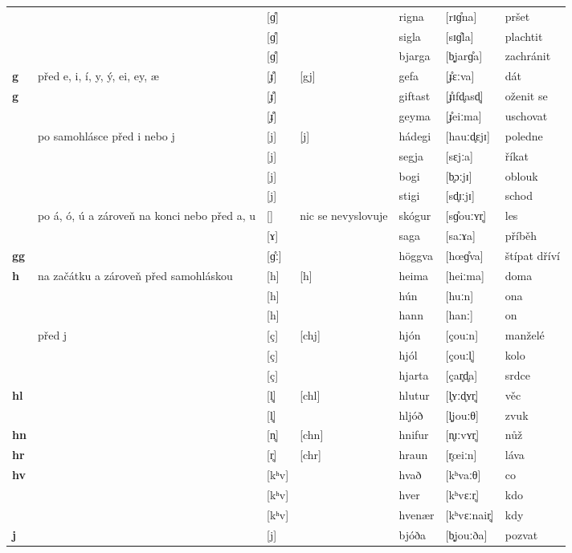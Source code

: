 \begin{longtable}{>{\bfseries}lX>{\IPAFont}lXl>{\IPAFont}ll}
 &  & {[ɡ̊]} &  & rigna & {[rɪɡ̊na]} & pršet \\ 
 &  & {[ɡ̊]} &   & sigla & {[sɪɡ̊la]} & plachtit \\ 
 &  & {[ɡ̊]} &   & bjarga & {[b̥jarɡ̊a]} & zachránit \\ 
g  & před e, i, í, y, ý, ei, ey, æ & {[\r ɟ]} & [gj] & gefa & {[\r ɟɛːva]} & dát \\ 
g &  & {[\r ɟ]} &   & giftast & {[\r ɟɪfd̥asd̥]} & oženit se \\ 
 &  & {[\r ɟ]} &   & geyma & {[\r ɟeiːma]} & uschovat \\ 
 & po samohlásce před i nebo j & {[j]} & [j] & hádegi & {[hauːd̥ɛjɪ]} & poledne \\ 
 &  & {[j]} &   & segja & {[sɛjːa]} & říkat \\ 
 &  & {[j]} &   & bogi & {[b̥ɔːjɪ]} & oblouk \\ 
 &  & {[j]} &   & stigi & {[sd̥ɪːjɪ]} & schod \\ 
 & po á, ó, ú a zároveň na konci nebo před a, u & {[]} & nic se nevyslovuje & skógur & {[sɡ̊ouːʏr̥]} & les \\ 
 &  & {[ɤ]} &   & saga & {[saːɤa]} & příběh \\ 
gg &  & {[ɡ̊ː]} &   & höggva & {[h\oe ɡ̊va]} & štípat dříví \\ 
h & na začátku a zároveň před samohláskou & {[h]} & [h] & heima & {[heiːma]} & doma \\ 
 &  & {[h]} &   & hún & {[huːn]} & ona \\ 
 &  & {[h]} &   & hann & {[hanː]} & on  \\ 
 & před j & {[ç]} & [chj] & hjón & {[çouːn]} & manželé \\ 
 &  & {[ç]} &  & hjól & {[çouːl̥]} & kolo \\ 
 &  & {[ç]} &  & hjarta & {[çar̥d̥a]} & srdce \\ 
hl &  & {[l̥]} & [chl] & hlutur & {[l̥ʏːd̥ʏr̥]} & věc \\ 
 &  & {[l̥]} &  & hljóð & {[l̥jouːθ]} & zvuk \\ 
hn &  & {[n̥]} & [chn] & hnifur & {[n̥ɪːvʏr̥]} & nůž \\ 
hr &  & {[r̥]} & [chr] & hraun & {[r̥\oe iːn]} & láva \\ 
hv &  & {[kʰv]} & & hvað & {[kʰvaːθ]} & co \\ 
 &  & {[kʰv]} &   & hver & {[kʰvɛːr̥]} & kdo \\ 
 &  & {[kʰv]} &   & hvenær & {[kʰvɛːnair̥]} & kdy \\ 
j &  & {[j]} &   & bjóða & {[b̥jouːða]} & pozvat \\ 

\end{longtable}
